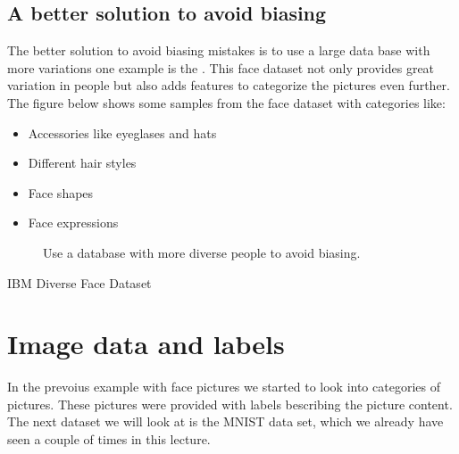 \documentclass[letterpaper,10pt,english]{sphinxmanual}
\begin{document}
\subsection{A better solution to avoid biasing}
\label{\detokenize{03-Datasets:a-better-solution-to-avoid-biasing}}
\sphinxAtStartPar
{}

\sphinxAtStartPar
The better solution to avoid biasing mistakes is to use a large data base with more variations one example is the . This face dataset not only provides great variation in people but also adds features to categorize the pictures even further. The figure below shows some samples from the face dataset with categories like:
\begin{itemize}
\item {} 
\sphinxAtStartPar
Accessories like eyeglases and hats

\item {} 
\sphinxAtStartPar
Different hair styles

\item {} 
\sphinxAtStartPar
Face shapes

\item {} 
\sphinxAtStartPar
Face expressions

\end{itemize}

\begin{figure}[htbp]
\centering
\capstart

\noindent{}
\caption{Use a database with more diverse people to avoid biasing.}\label{\detokenize{03-Datasets:id19}}\end{figure}



\sphinxAtStartPar
IBM Diverse Face Dataset


\section{Image data and labels}
\label{\detokenize{03-Datasets:image-data-and-labels}}
\sphinxAtStartPar
In the prevoius example with face pictures we started to look into categories of pictures. These pictures were provided with labels bescribing the picture content. The next dataset we will look at is the MNIST data set, which we already have seen a couple of times in this lecture.
\end{document}
